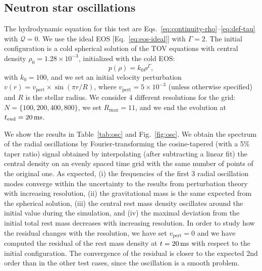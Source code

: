 \documentclass[aps,prd,twocolumn,a4paper,floatfix,nofootbib,superscriptaddress,nofootinbib]{revtex4}
\begin{document}
\subsection{Neutron star oscillations}
\label{ssec:test-oscillations}

The hydrodynamic equation for this test are Eqs.~\eqref{eq:continuity-rho}--\eqref{eq:def-tau}
with $\mathcal Q=0$.
We use the ideal EOS [Eq.~\eqref{eq:eos-ideal}] with $\Gamma=2$.
The initial configuration is a cold spherical solution of the TOV
equations with central density $\rho_0=1.28\times10^{-3}$, initialized
with the cold EOS:
%
\begin{equation}
\label{eq:eos-cold}
p(\rho)= k_0\rho^\Gamma,
\end{equation}
%
with $k_0=100$, and we set an initial velocity perturbation $v(r)=v_\mathrm{pert}\times\sin(\pi r/R)$,
where $v_\mathrm{pert}=5\times 10^{-3}$ (unless otherwise specified) and $R$ is the stellar radius.
We consider 4 different resolutions for the grid: $N=\{100,200,400,800\}$, we set
$R_\mathrm{max}=11$, and we end the evolution at $t_\mathrm{end}=\unit[20]{ms}$.

We show the results in Table~\ref{tab:osc} and Fig.~\ref{fig:osc}.  We obtain
the spectrum of the radial oscillations by Fourier-transforming the
cosine-tapered (with a 5\% taper ratio) signal obtained by interpolating (after
subtracting a linear fit) the central density on an evenly spaced time grid
with the same number of points of the original one.  As expected, (i) the
frequencies of the first 3 radial oscillation modes converge within the
uncertainty to the results from perturbation theory \citep{Baiotti09} with
increasing resolution, (ii) the gravitational mass is the same expected from the
spherical solution, (iii) the central rest mass density
oscillates around the initial value during
the simulation, and (iv) the maximal deviation from the initial total rest mass
decreases with increasing resolution.
In order to study how the residual changes with the resolution, we have set $v_\mathrm{pert}=0$
and we have computed the residual of the rest mass density at $t=\unit[20]{ms}$
with respect to the initial configuration. The convergence of the residual
is closer to the expected 2nd order than in the other test cases,
since the oscillation is a smooth problem.
\end{document}
